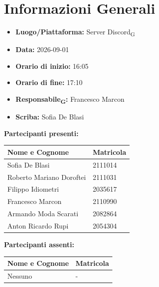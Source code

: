 \section{Informazioni Generali}

\begin{itemize}
\item \textbf{Luogo/Piattaforma:} Server Discord\textsubscript{G}
\item \textbf{Data:} 2026-09-01
\item \textbf{Orario di inizio:} 16:05
\item \textbf{Orario di fine:} 17:10
\item \textbf{Responsabile\textsubscript{G}:} Francesco Marcon
\item \textbf{Scriba:} Sofia De Blasi
\end{itemize}

\vspace{0.5cm}

\textbf{Partecipanti presenti:}

\begin{table}[ht]
\centering
\renewcommand{\arraystretch}{1.2}
\begin{tabularx}{\textwidth}{X l}
\toprule
\textbf{Nome e Cognome} & \textbf{Matricola} \\
\midrule
Sofia De Blasi & 2111014 \\
Roberto Mariano Doroftei & 2111031 \\
Filippo Idiometri & 2035617 \\
Francesco Marcon & 2110990 \\
Armando Moda Scarati & 2082864 \\
Anton Ricardo Rupi & 2054304 \\
\bottomrule
\end{tabularx}
\end{table}

\vspace{0.5cm}

\textbf{Partecipanti assenti:}

\begin{table}[ht]
\centering
\renewcommand{\arraystretch}{1.2}
\begin{tabularx}{\textwidth}{X l}
\toprule
\textbf{Nome e Cognome} & \textbf{Matricola} \\
\midrule
Nessuno & - \\
\bottomrule
\end{tabularx}
\end{table}


